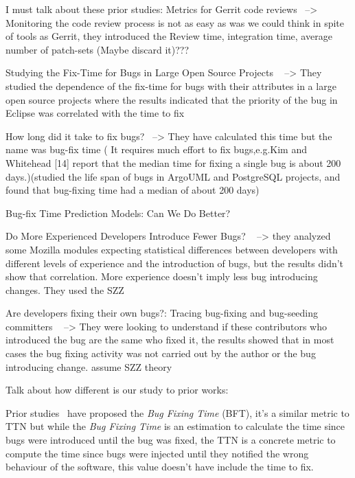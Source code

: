 \documentclass[10pt, conference]{IEEEtran}
\begin{document}
I must talk about these prior studies:
 Metrics for Gerrit code reviews~\cite{lehtonen2015metrics} --> Monitoring the code review process is not as easy as was we could think in spite of tools as Gerrit, they introduced the Review time, integration time, average number of patch-sets (Maybe discard it)???
 
Studying the Fix-Time for Bugs in Large Open Source Projects ~\cite{marks2011studying} --> They studied the dependence of  the fix-time for bugs with their attributes in a large open source projects where the results indicated that the priority of the bug in Eclipse was correlated with the time to fix

How long did it take to fix bugs?~\cite{kim2006long} --> They have calculated this time but the name was bug-fix time ( It requires much effort to fix bugs,e.g.Kim and Whitehead [14] report that the median time for fixing a single bug is about 200 days.)(studied  the  life  span  of  bugs  in  ArgoUML  and  PostgreSQL projects, and found that bug-fixing time had a median of about 200 days)

Bug-fix Time Prediction Models: Can We Do Better? ~\cite{bhattacharya2011bug} 

Do More Experienced Developers Introduce Fewer Bugs? ~\cite{izquierdo2012more} --> they analyzed some Mozilla modules expecting statistical differences between developers with different levels of experience and the introduction of bugs, but the results didn't show that correlation. More experience doesn't imply less bug introducing changes. They used the SZZ

Are developers fixing their own bugs?: Tracing bug-fixing and bug-seeding committers ~\cite{izquierdo2011developers} --> They were looking to understand if these contributors who introduced the bug are the same who fixed it, the results showed that in most cases the bug fixing activity was not carried out by the author or the bug introducing change. assume SZZ theory

Talk about how different is our study to prior works:

Prior studies~\cite{kim2006long} have proposed the \emph{Bug Fixing Time} (BFT), it's a similar metric to TTN but while the \emph{Bug Fixing Time} is an estimation to calculate the time since bugs were introduced until the bug was fixed, the TTN is a concrete metric to compute the time since bugs were injected until they notified the wrong behaviour of the software, this value doesn't have include the time to fix.
\end{document}
